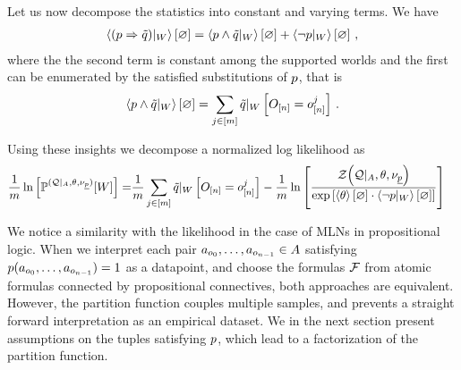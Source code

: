 Let us now decompose the statistics into constant and varying terms.
We have
\begin{align*}
	\left\langle {(p\Rightarrow\tilde{q})}|_{W}\right\rangle \left[ \varnothing \right] = 
		\left\langle {p\land\tilde{q}}|_{W}\right\rangle \left[ \varnothing \right] + \left\langle {\lnot p}|_{W}\right\rangle \left[ \varnothing \right] \, ,
\end{align*}
where the the second term is constant among the supported worlds and the first can be enumerated by the satisfied substitutions of $p$, that is
\begin{align*}
	\left\langle {p\land\tilde{q}}|_{W}\right\rangle \left[ \varnothing \right] 
	= \sum_{j\in[m]}{\tilde{q}}|_{W} \left[O_{[n]} = o_{[n]}^{j}\right] \, . 
\end{align*}


Using these insights we decompose a normalized log likelihood as
\begin{align}\label{eq:dataworldLogProb}
	\frac{1}{m} \ln \left[ \mathbb{P}^{(\mathcal{Q} |_{A},\theta , \nu_{\underline{p}})} [W] \right]
	= & \frac{1}{m} \sum_{j\in[m]} {\tilde{q}}|_{W} \left[O_{[n]} = o_{[n]}^{j}\right] 
	- \frac{1}{m} \ln \left[ 
		\frac{\mathcal{Z}{\left(\mathcal{Q} |_{A},\theta , \nu_{\underline{p}}\right)}}{
			\mathrm{exp}\left[\left\langle \theta\right\rangle \left[ \varnothing \right] \cdot \left\langle {\lnot p}|_{W}\right\rangle \left[ \varnothing \right]\right]
		}
	 \right]
\end{align} 

We notice a similarity with the likelihood in the case of MLNs in propositional logic.
When we interpret each pair $a_{o_{0}},\ldots,a_{o_{n-1}}\in A$ satisfying $p(a_{o_{0}},\ldots,a_{o_{n-1}})=1$ as a datapoint, and choose the formulas $\mathcal{F}$ from atomic formulas connected by propositional connectives, both approaches are equivalent.
However, the partition function couples multiple samples, and prevents a straight forward interpretation as an empirical dataset.
We in the next section present assumptions on the tuples satisfying $p$, which lead to a factorization of the partition function.




